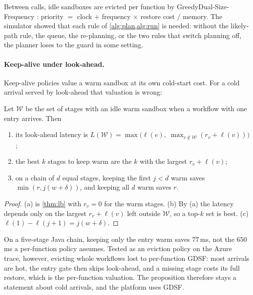 Between calls, idle sandboxes are evicted per function by GreedyDual-Size-Frequency
\cite{cherkasova1998,faascache2021,cidre2025}: priority $=$ clock $+$ frequency $\times$ restore
cost $/$ memory. The simulator showed that each rule of \cref{alg:plan,alg:run} is needed: without
the likely-path rule, the queue, the re-planning, or the two rules that switch planning off,
the planner loses to the guard in some setting.

\paragraph{Keep-alive under look-ahead.} Keep-alive policies value a warm sandbox at its own
cold-start cost. For a cold arrival served by look-ahead that valuation is wrong:

\begin{proposition}
\label{prop:keepalive}
Let $\mathcal{W}$ be the set of stages with an idle warm sandbox when a workflow with one entry
arrives. Then
\begin{enumerate}[label=(\alph*)]
  \item its look-ahead latency is
        $L(\mathcal{W}) = \max\bigl(\ell(e),\; \max_{v \notin \mathcal{W}} (r_v + \ell(v))\bigr)$;
  \item the best $k$ stages to keep warm are the $k$ with the largest $r_v + \ell(v)$;
  \item on a chain of $d$ equal stages, keeping the first $j < d$ warm saves $\min(r, j(w +
        \delta))$, and keeping all $d$ warm saves $r$.
\end{enumerate}
\end{proposition}

\begin{proof}
(a) is \cref{thm:lb} with $r_v = 0$ for the warm stages. (b) By (a) the latency depends only on
the largest $r_v + \ell(v)$ left outside $\mathcal{W}$, so a top-$k$ set is best. (c)
$\ell(1) - \ell(j + 1) = j(w + \delta)$.
\end{proof}

On a five-stage Java chain, keeping only the entry warm saves $77$\,ms, not the $650$\,ms a
per-function policy assumes. Tested as an eviction policy on the Azure trace, however, evicting
whole workflows lost to per-function GDSF: most arrivals are hot, the entry gate then skips
look-ahead, and a missing stage costs its full restore, which is the per-function valuation. The
proposition therefore stays a statement about cold arrivals, and the platform uses GDSF.

